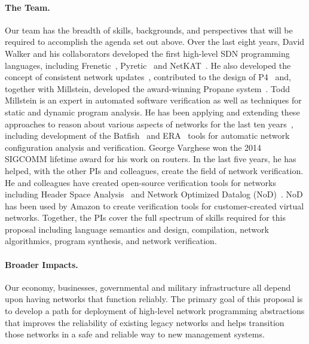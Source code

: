 \paragraph{The Team.}  Our team has the breadth of skills, backgrounds, and perspectives that will be required to accomplish the agenda set out above.  
Over the last eight years, David Walker and his collaborators
developed the first high-level SDN programming languages, including
Frenetic~\cite{frenetic}, Pyretic~\cite{pyretic} and NetKAT~\cite{netkat}.
He also developed the concept of consistent network updates~\cite{reitblatt+:consistent-updates},
 contributed to the design of P4~\cite{P4} and, together with Millstein, 
developed the award-winning
Propane system~\cite{beckett+:propane}.   Todd Millstein is an expert in automated software verification as well as techniques for static and dynamic program analysis.  He has been applying and extending these approaches to reason about various aspects of networks for the last ten years~\cite{DBLP:conf/pldi/KothariGMG07,gullible,DBLP:conf/sigcomm/KothariMMGM11,DBLP:conf/nsdi/PedrosaFKGMM15}, including development of the Batfish~\cite{batfish} and ERA~\cite{era} tools for automatic network configuration analysis and verification. George Varghese won the 2014 SIGCOMM lifetime award for his work on routers.  In the last five years, he has helped, with the other PIs and colleagues, create the field of network verification.  He and colleagues have created open-source verification tools for networks including Header Space Analysis~\cite{hsa} and Network Optimized Datalog (NoD)~\cite{nod}. NoD has been used by Amazon to create verification tools for customer-created virtual networks.  Together, the PIs cover the full spectrum of skills required for this proposal including
language semantics and design,
compilation,
network algorithmics,
program synthesis, and
network verification.

\paragraph{Broader Impacts.}  
Our economy, businesses, governmental and military infrastructure all depend upon having networks that function
reliably.  
The primary goal of this proposal is to develop
a path for deployment of high-level network programming abstractions that
improves the reliability of existing legacy networks and helps
transition those networks in a safe and reliable way to new management systems.

